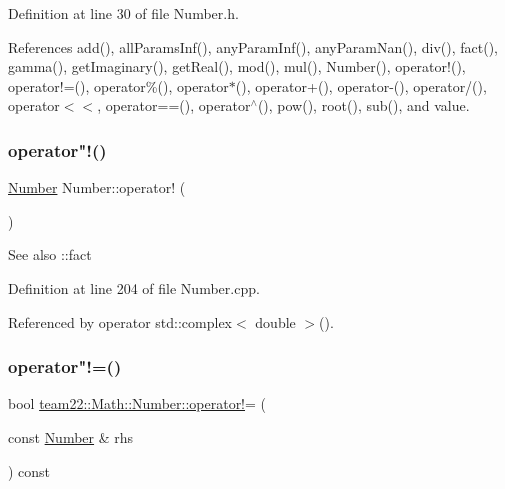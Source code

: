 Definition at line 30 of file Number.\+h.



References add(), all\+Params\+Inf(), any\+Param\+Inf(), any\+Param\+Nan(), div(), fact(), gamma(), get\+Imaginary(), get\+Real(), mod(), mul(), Number(), operator!(), operator!=(), operator\%(), operator$\ast$(), operator+(), operator-\/(), operator/(), operator$<$$<$, operator==(), operator$^\wedge$(), pow(), root(), sub(), and value.

\mbox{\label{classteam22_1_1_math_1_1_number_a93e5b0fdb56c604e76fa5dd28751f443}} 
\subsubsection{\texorpdfstring{operator"!()}{operator!()}}
{\footnotesize\ttfamily \hyperlink{classteam22_1_1_math_1_1_number}{Number} Number\+::operator! (\begin{DoxyParamCaption}{ }\end{DoxyParamCaption})}

\begin{DoxySeeAlso}{See also}
\+::fact 
\end{DoxySeeAlso}


Definition at line 204 of file Number.\+cpp.



Referenced by operator std\+::complex$<$ double $>$().

\mbox{\label{classteam22_1_1_math_1_1_number_a3254778b239c52df6b311615f2cd0ad5}} 
\subsubsection{\texorpdfstring{operator"!=()}{operator!=()}}
{\footnotesize\ttfamily bool \hyperlink{classteam22_1_1_math_1_1_number_a93e5b0fdb56c604e76fa5dd28751f443}{team22\+::\+Math\+::\+Number\+::operator!}= (\begin{DoxyParamCaption}\item[{const \hyperlink{classteam22_1_1_math_1_1_number}{Number} \&}]{rhs }\end{DoxyParamCaption}) const}



